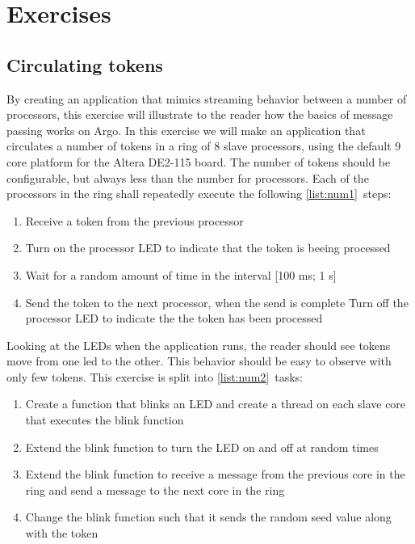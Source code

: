 \documentclass[a4paper,fontsize=10pt,twoside,DIV15,BCOR12mm,headinclude=true,footinclude=false,pagesize,bibtotoc]{scrbook}
\begin{document}

\chapter{Exercises}
\label{chap:exercise}
\section{Circulating tokens}
By creating an application that mimics streaming behavior between a number of processors, this exercise will illustrate to the reader how the basics of message passing works on Argo.
In this exercise we will make an application that circulates a number of tokens in a ring of 8 slave processors,
using the default 9 core platform for the Altera DE2-115 board.
The number of tokens should be configurable, but always less than the number for processors.
Each of the processors in the ring shall repeatedly execute the following \ref{list:num1}~steps:

\begin{framed}
\begin{enumerate}
\item Receive a token from the previous processor

\item Turn on the processor LED to indicate that the token is beeing processed

\item Wait for a random amount of time in the interval [100 ms; 1 s]
\label{list:step_rand}
\item Send the token to the next processor, when the send is complete Turn off the processor LED to indicate the the token has been processed

\label{list:num1}\end{enumerate}
\end{framed}

\noindent Looking at the LEDs when the application runs,
the reader should see tokens move from one led to the other.
This behavior should be easy to observe with only few tokens.
This exercise is split into \ref{list:num2}~tasks:
\begin{framed}
\begin{enumerate}
\item Create a function that blinks an LED and create a thread on each slave core that executes the blink function
\item Extend the blink function to turn the LED on and off at random times
\item Extend the blink function to receive a message from the previous core in the ring and send a message to the next core in the ring
\item Change the blink function such that it sends the random seed value along with the token
\label{list:num2}\end{enumerate}
\end{framed}
\end{document}
